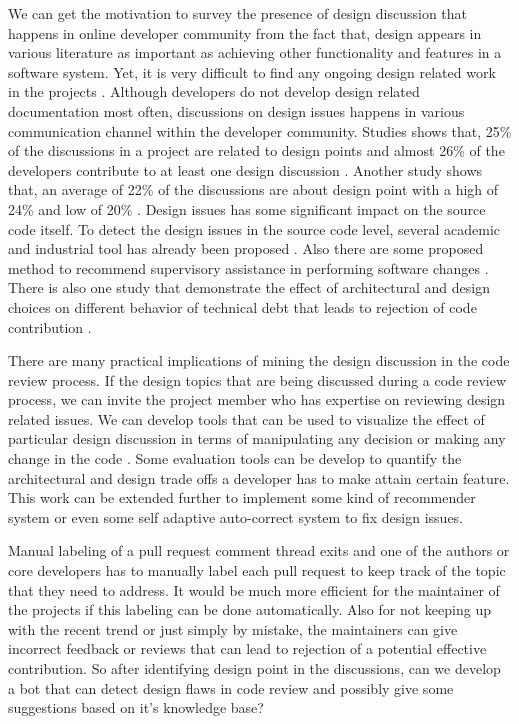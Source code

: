 We can get the motivation to survey the presence of design discussion that happens in online developer community from the fact that, design appears in various literature as important as achieving other functionality and features in a software system. Yet, it is very difficult to find any ongoing design related work in the projects \cite{Brunet2014a}. Although developers do not develop design related documentation most often, discussions on design issues happens in various communication channel within the developer community. Studies shows that, 25\% of the discussions in a project are related to design points and almost 26\% of the developers contribute to at least one design discussion \cite{Brunet2014a}. Another study shows that, an average of 22\% of the discussions are about design point with a high of 24\% and low of 20\% \cite{Viviani2018}. Design issues has some significant impact on the source code itself. To detect the design issues in the source code level, several academic and industrial tool has already been proposed \cite{Sousa2018}. Also there are some proposed method to recommend supervisory assistance in performing software changes \cite{Kagdi2008}. There is also one study that demonstrate the effect of architectural and design choices on different behavior of technical debt that leads to rejection of code contribution \cite{Curtis2012a}.

There are many practical implications of mining the design discussion in the code review process. If the design topics that are being discussed during a code review process, we can invite the project member who has expertise on reviewing design related issues. We can develop tools that can be used to visualize the effect of particular design discussion in terms of manipulating any decision or making any change in the code \cite{Viviani2018a}. Some evaluation tools can be develop to quantify the architectural and design trade offs a developer has to make attain certain feature. This work can be extended further to implement some kind of recommender system or even some self adaptive auto-correct system to fix design issues.

Manual labeling of a pull request comment thread exits and one of the authors or core developers has to manually label each pull request to keep track of the topic that they need to address. It would be much more efficient for the maintainer of the projects if this labeling can be done automatically. Also for not keeping up with the recent trend or just simply by mistake, the maintainers can give incorrect feedback or reviews that can lead to rejection of a potential effective contribution. So after identifying design point in the discussions, can we develop a bot that can detect design flaws in code review and possibly give some suggestions based on it's knowledge base?        

   
